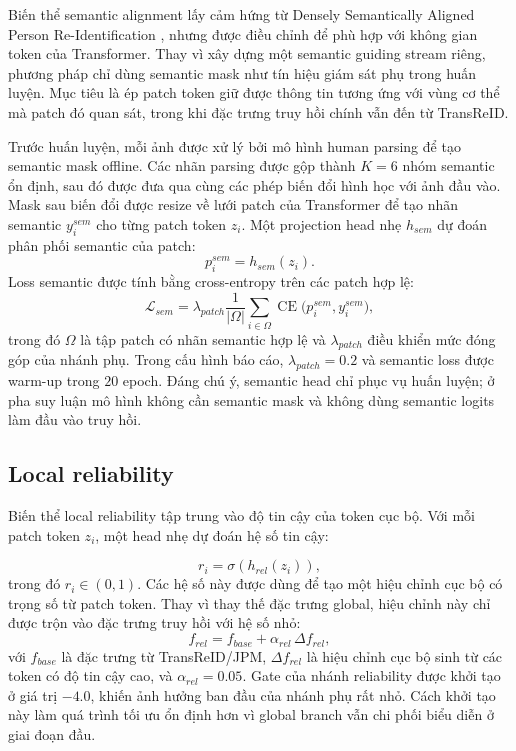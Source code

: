 Biến thể semantic alignment lấy cảm hứng từ Densely Semantically Aligned
Person Re-Identification
\cite{zhang2019denselysemanticallyalignedperson}, nhưng được điều chỉnh để phù
hợp với không gian token của Transformer. Thay vì xây dựng một semantic guiding
stream riêng, phương pháp chỉ dùng semantic mask như tín hiệu giám sát phụ
trong huấn luyện. Mục tiêu là ép patch token giữ được thông tin tương ứng với
vùng cơ thể mà patch đó quan sát, trong khi đặc trưng truy hồi chính vẫn đến từ
TransReID.

Trước huấn luyện, mỗi ảnh được xử lý bởi mô hình human parsing để tạo semantic
mask offline. Các nhãn parsing được gộp thành \(K=6\) nhóm semantic ổn định,
sau đó được đưa qua cùng các phép biến đổi hình học với ảnh đầu vào. Mask sau
biến đổi được resize về lưới patch của Transformer để tạo nhãn semantic
\(y_i^{sem}\) cho từng patch token \(z_i\). Một projection head nhẹ
\(h_{sem}\) dự đoán phân phối semantic của patch:
\[
p_i^{sem} = h_{sem}(z_i).
\]
Loss semantic được tính bằng cross-entropy trên các patch hợp lệ:
\[
\mathcal{L}_{sem}
= \lambda_{patch}
\frac{1}{|\Omega|}
\sum_{i \in \Omega}
\operatorname{CE}\bigl(p_i^{sem}, y_i^{sem}\bigr),
\]
trong đó \(\Omega\) là tập patch có nhãn semantic hợp lệ và
\(\lambda_{patch}\) điều khiển mức đóng góp của nhánh phụ. Trong cấu hình báo
cáo, \(\lambda_{patch}=0.2\) và semantic loss được warm-up trong $20$ epoch.
Đáng chú ý, semantic head chỉ phục vụ huấn luyện; ở pha suy luận mô hình không
cần semantic mask và không dùng semantic logits làm đầu vào truy hồi.

\subsection{Local reliability}

Biến thể local reliability tập trung vào độ tin cậy của token cục bộ. Với mỗi
patch token \(z_i\), một head nhẹ dự đoán hệ số tin cậy:

\[
r_i = \sigma(h_{rel}(z_i)),
\]
trong đó \(r_i \in (0,1)\). Các hệ số này được dùng để tạo một hiệu chỉnh cục
bộ có trọng số từ patch token. Thay vì thay thế đặc trưng global, hiệu chỉnh
này chỉ được trộn vào đặc trưng truy hồi với hệ số nhỏ:
\[
f_{rel}
= f_{base} + \alpha_{rel}\,\Delta f_{rel},
\]
với \(f_{base}\) là đặc trưng từ TransReID/JPM, \(\Delta f_{rel}\) là hiệu
chỉnh cục bộ sinh từ các token có độ tin cậy cao, và
\(\alpha_{rel}=0.05\). Gate của nhánh reliability được khởi tạo ở giá trị
\(-4.0\), khiến ảnh hưởng ban đầu của nhánh phụ rất nhỏ. Cách khởi tạo này làm
quá trình tối ưu ổn định hơn vì global branch vẫn chi phối biểu diễn ở giai
đoạn đầu.

